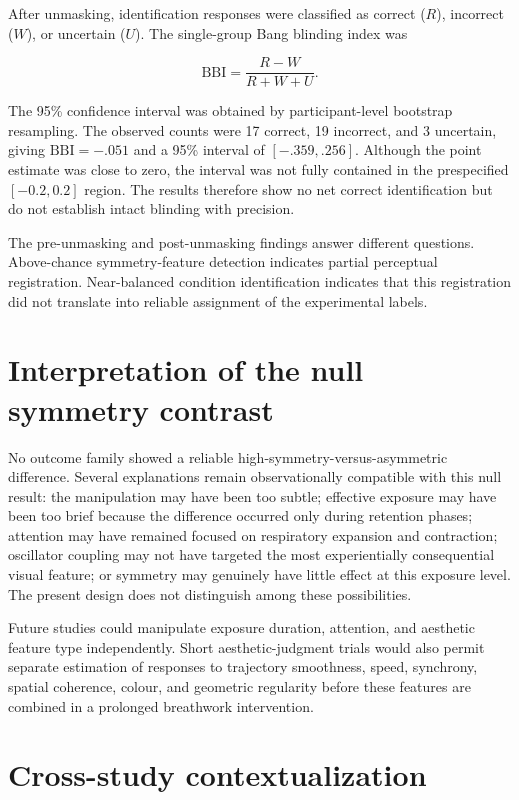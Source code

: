 \documentclass[pdflatex,sn-mathphys-num]{sn-jnl}
\begin{document}
After unmasking, identification responses were classified as correct ($R$), incorrect ($W$), or uncertain ($U$). The single-group Bang blinding index was

\begin{equation}
\mathrm{BBI}=\frac{R-W}{R+W+U}.
\end{equation}

The 95\% confidence interval was obtained by participant-level bootstrap resampling. The observed counts were 17 correct, 19 incorrect, and 3 uncertain, giving $\mathrm{BBI}=-.051$ and a 95\% interval of $[-.359,.256]$. Although the point estimate was close to zero, the interval was not fully contained in the prespecified $[-0.2,0.2]$ region. The results therefore show no net correct identification but do not establish intact blinding with precision.

The pre-unmasking and post-unmasking findings answer different questions. Above-chance symmetry-feature detection indicates partial perceptual registration. Near-balanced condition identification indicates that this registration did not translate into reliable assignment of the experimental labels.

\section{Interpretation of the null symmetry contrast}

No outcome family showed a reliable high-symmetry-versus-asymmetric difference. Several explanations remain observationally compatible with this null result: the manipulation may have been too subtle; effective exposure may have been too brief because the difference occurred only during retention phases; attention may have remained focused on respiratory expansion and contraction; oscillator coupling may not have targeted the most experientially consequential visual feature; or symmetry may genuinely have little effect at this exposure level. The present design does not distinguish among these possibilities.

Future studies could manipulate exposure duration, attention, and aesthetic feature type independently. Short aesthetic-judgment trials would also permit separate estimation of responses to trajectory smoothness, speed, synchrony, spatial coherence, colour, and geometric regularity before these features are combined in a prolonged breathwork intervention.

\section{Cross-study contextualization}
\end{document}
